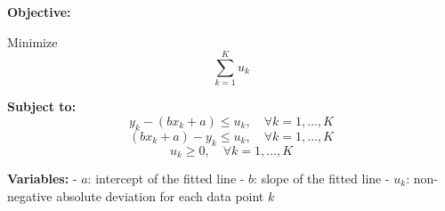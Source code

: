 \documentclass{article}
\begin{document}
\textbf{Objective:} 

Minimize
\[
\sum_{k=1}^{K} u_k
\]

\textbf{Subject to:}
\[
y_k - (b x_k + a) \leq u_k, \quad \forall k = 1, \ldots, K
\]
\[
(b x_k + a) - y_k \leq u_k, \quad \forall k = 1, \ldots, K
\]
\[
u_k \geq 0, \quad \forall k = 1, \ldots, K
\]

\textbf{Variables:}
- \( a \): intercept of the fitted line
- \( b \): slope of the fitted line
- \( u_k \): non-negative absolute deviation for each data point \( k \)
\end{document}
